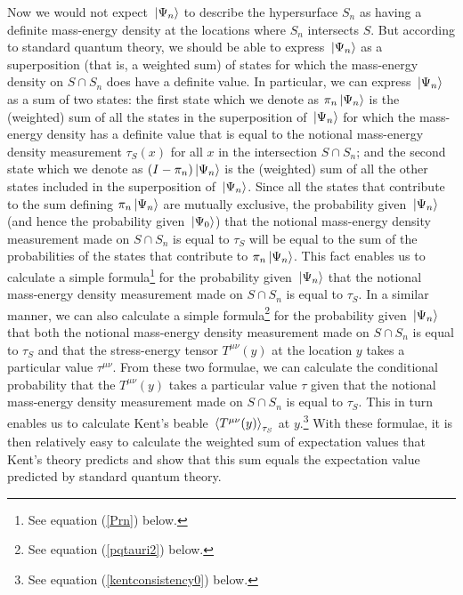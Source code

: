 Now we would not expect $\ket*{\Psi_n}$ to describe the hypersurface $S_n$ as having a definite mass-energy density at the locations where $S_n$ intersects $S$. But according to standard quantum theory, we should be able to express $\ket*{\Psi_n}$ as a superposition (that is, a weighted sum) of states for which the mass-energy density on $S\cap S_n$ does have a definite value. In particular, we can express $\ket*{\Psi_n}$ as a sum of two states: the first state which we denote as $\pi_n \ket*{\Psi_n}$ \label{overviewpi}
is the (weighted) sum of all the states in the superposition of $\ket*{\Psi_n}$ for which the mass-energy density has a definite value that is equal to the notional mass-energy density measurement $\tau_S(x)$ for all $x$ in the intersection $S\cap S_n$; and the second state which we denote as $(I- \pi_n) \ket*{\Psi_n}$ is the (weighted) sum of all the other states included in the superposition of $\ket*{\Psi_n}$. Since all the states that contribute to the sum defining $\pi_n \ket*{\Psi_n}$ are mutually exclusive, the probability given $\ket*{\Psi_n}$ (and hence  the probability given $\ket*{\Psi_0}$) that the notional mass-energy density measurement made on $S\cap S_n$ is equal to $\tau_S$ will be equal to the sum of the probabilities of the states that contribute to $\pi_n \ket*{\Psi_n}$. This fact enables us to calculate a simple formula\footnote{See equation (\ref{Prn}) below.} for the probability given $\ket*{\Psi_n}$ that the notional mass-energy density measurement made on $S\cap S_n$ is equal to $\tau_S$. In a similar manner, we can also calculate a simple formula\footnote{See equation (\ref{pqtauri2}) below.} for the probability given $\ket*{\Psi_n}$ that both the notional mass-energy density measurement made on $S\cap S_n$ is equal to $\tau_S$ and that the stress-energy tensor $T^{\mu\nu}(y)$ at the location $y$ takes a particular value $\tau^{\mu\nu}$. %
%
 From these two formulae, we can calculate the conditional probability that the $T^{\mu\nu}(y)$ takes a particular value $\tau$ given that the notional mass-energy density measurement made on $S\cap S_n$ is equal to $\tau_S$. This in turn enables us to calculate Kent's beable $\ev*{T^{\mu\nu}(y)}_{\tau_S}$ at $y$.\footnote{See equation (\ref{kentconsistency0}) below.} With these formulae, it is then relatively easy to calculate the weighted sum of expectation values that Kent's theory predicts and show that this sum equals the expectation value predicted by standard quantum theory.


